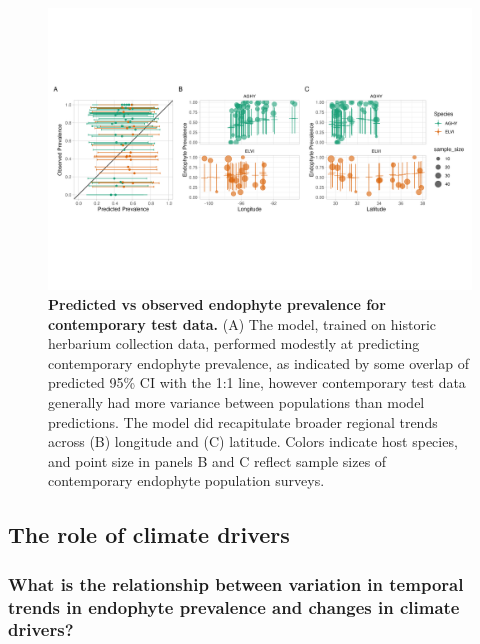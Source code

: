\documentclass[11pt]{article}
\begin{document}
\begin{figure}[H]
	\centering
	\includegraphics[width = \linewidth]{contemp_test_plot.png}
	\caption{\textbf{Predicted vs observed endophyte prevalence for contemporary test data.} (A) The model, trained on historic herbarium collection data, performed modestly at predicting contemporary endophyte prevalence, as indicated by some overlap of predicted 95\% CI with the 1:1 line, however contemporary test data generally had more variance between populations than model predictions. The model did recapitulate broader regional trends across (B) longitude and (C) latitude. Colors indicate host species, and point size in panels B and C reflect sample sizes of contemporary endophyte population surveys.}
\end{figure}



\subsection*{The role of climate drivers}
\subsubsection*{What is the relationship between variation in temporal trends in endophyte prevalence and changes in climate drivers?}
\end{document}
